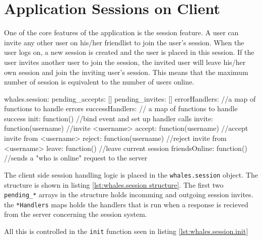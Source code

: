 \section{Application Sessions on Client}
One of the core features of the application is the session feature. A user can
invite any other user on his/her friendlist to join the user's session. When the
user logs on, a new session is created and the user is placed in this session.
If the user invites another user to join the session, the invited user will
leave his/her own session and join the inviting user's session. This means that
the maximum number of session is equivalent to the number of users online.

\begin{snippet}[language=JavaScript,label=lst:whales.session structure,caption=The whales.session structure]
whales.session: {
    pending_accepts: []
    pending_invites: []
    errorHandlers: {} //a map of functions to handle errors
    successHandlers: {} // a map of functions to handle success
    init: function() //bind event and set up handler calls
    invite: function(username) //invite <username>
    accept: function(username) //accept invite from <username>
    reject: function(username) //reject invite from <username>
    leave: function() //leave current session
    friendsOnline: function() //sends a "who is online" request to the server
}
\end{snippet}

The client side session handling logic is placed in the
\lstinline$whales.session$ object. The structure is shown in listing \ref{lst:whales.session structure}.
The first two \verb$pending_*$ arrays in the structure holds incomming and
outgoing session invites. the \verb$*Handlers$ maps holds the handlers that is
run when a response is recieved from the server concerning the session system.


All this is controlled in the \verb$init$ function seen in listing \ref{lst:whales.session.init}


